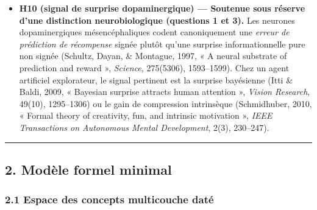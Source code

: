 \documentclass[a4paper,11pt]{article}
\begin{document}
\begin{itemize}
  fonctionnels (Tshitoyan et al., 2019, « Unsupervised word embeddings
  capture latent knowledge from materials science literature »,
  \emph{Nature}, 571(7763), 95--98). Cependant, les vecteurs de
  cooccurrence confondent proximité thématique de surface et
  isomorphisme relationnel abstrait : extraire ce dernier exige des
  représentations explicites des relations (Lu, Wu, \& Holyoak, 2019, «
  Emergence of analogy from relation learning », \emph{PNAS}, 116(10),
  4176--4181).
\item
  \textbf{H10 (signal de surprise dopaminergique) --- Soutenue sous
  réserve d'une distinction neurobiologique (questions 1 et 3).} Les
  neurones dopaminergiques mésencéphaliques codent canoniquement une
  \emph{erreur de prédiction de récompense} signée plutôt qu'une
  surprise informationnelle pure non signée (Schultz, Dayan, \&
  Montague, 1997, « A neural substrate of prediction and reward »,
  \emph{Science}, 275(5306), 1593--1599). Chez un agent artificiel
  explorateur, le signal pertinent est la surprise bayésienne (Itti \&
  Baldi, 2009, « Bayesian surprise attracts human attention »,
  \emph{Vision Research}, 49(10), 1295--1306) ou le gain de compression
  intrinsèque (Schmidhuber, 2010, « Formal theory of creativity, fun,
  and intrinsic motivation », \emph{IEEE Transactions on Autonomous
  Mental Development}, 2(3), 230--247).
\end{itemize}

\begin{center}\rule{0.5\linewidth}{0.5pt}\end{center}

\subsection*{2. Modèle formel minimal}

\subsubsection*{2.1 Espace des concepts multicouche daté}
\end{document}
